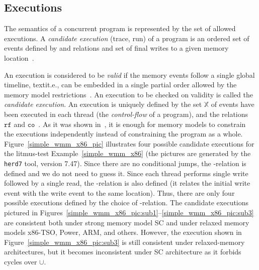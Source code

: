 \subsection{Executions}
\label{ch:wmm:model:executions}

The semantics of a concurrent program is represented by the set of allowed executions.
A \textit{candidate execution} (trace, run) of a program is an ordered set of events defined by \po and \rf relations and set of final writes to a given memory location~\cite{alglave2014herding}.

An execution is considered to be \textit{valid} if the memory events follow a single global timeline, textit.e., can be embedded in a single partial order allowed by the memory model restrictions~\cite{alglave2010shared}. 
An execution to be checked on validity is called the \textit{candidate execution}.
An execution is uniquely defined by the set $\mathbb{X}$ of events have been executed in each thread (the \textit{control-flow} of a program), and the relations $\mathtt{rf}$ and $\mathtt{co}$~\cite{alglave2010shared}.
As it was shown in~\cite{wickerson2017automatically}, it is enough for memory models to constrain the executions independently instead of constraining the program as a whole.
Figure~\ref{simple_wmm_x86_pic} illustrates four possible candidate executions for the litmus-test Example~\ref{simple_wmm_x86} (the pictures are generated by the \texttt{herd7} tool, version 7.47). Since there are no conditional jumps, the \po-relation is defined and we do not need to guess it. Since each thread performs single write followed by a single read, the \co-relation is also defined (it relates the initial write event with the write event to the same location). Thus, there are only four possible executions defined by the choice of \rf-relation. The candidate executions pictured in Figures~\ref{simple_wmm_x86_pic:sub1}--\ref{simple_wmm_x86_pic:sub3} are consistent both under strong memory model SC and under relaxed memory models x86-TSO, Power, ARM, and others. However, the execution shown in Figure~\ref{simple_wmm_x86_pic:sub3} is still consistent under relaxed-memory architectures, but it becomes inconsistent under SC architecture as it forbids cycles over \fr$\cup$\po.

